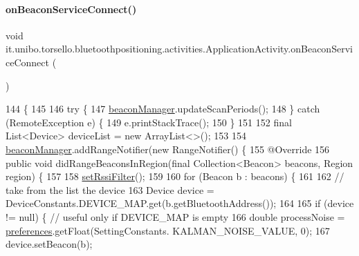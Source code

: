 \paragraph{\texorpdfstring{on\+Beacon\+Service\+Connect()}{onBeaconServiceConnect()}}
{\footnotesize\ttfamily void it.\+unibo.\+torsello.\+bluetoothpositioning.\+activities.\+Application\+Activity.\+on\+Beacon\+Service\+Connect (\begin{DoxyParamCaption}{ }\end{DoxyParamCaption})}


\begin{DoxyCode}
144                                          \{
145 
146         \textcolor{keywordflow}{try} \{
147             \hyperlink{classit_1_1unibo_1_1torsello_1_1bluetoothpositioning_1_1activities_1_1ApplicationActivity_a973c37226a3dbba6016966c3555aff65_a973c37226a3dbba6016966c3555aff65}{beaconManager}.updateScanPeriods();
148         \} \textcolor{keywordflow}{catch} (RemoteException e) \{
149             e.printStackTrace();
150         \}
151 
152         \textcolor{keyword}{final} List<Device> deviceList = \textcolor{keyword}{new} ArrayList<>();
153 
154         \hyperlink{classit_1_1unibo_1_1torsello_1_1bluetoothpositioning_1_1activities_1_1ApplicationActivity_a973c37226a3dbba6016966c3555aff65_a973c37226a3dbba6016966c3555aff65}{beaconManager}.addRangeNotifier(\textcolor{keyword}{new} RangeNotifier() \{
155             @Override
156             \textcolor{keyword}{public} \textcolor{keywordtype}{void} didRangeBeaconsInRegion(\textcolor{keyword}{final} Collection<Beacon> beacons, Region region) \{
157 
158                 \hyperlink{classit_1_1unibo_1_1torsello_1_1bluetoothpositioning_1_1activities_1_1ApplicationActivity_a8b2514096adfe574c15cc5317a45cd58_a8b2514096adfe574c15cc5317a45cd58}{setRssiFilter}();
159 
160                 \textcolor{keywordflow}{for} (Beacon b : beacons) \{
161 
162                     \textcolor{comment}{// take from the list the device}
163                     Device device = DeviceConstants.DEVICE\_MAP.get(b.getBluetoothAddress());
164 
165                     \textcolor{keywordflow}{if} (device != null) \{ \textcolor{comment}{// useful only if DEVICE\_MAP is empty}
166                         \textcolor{keywordtype}{double} processNoise = \hyperlink{classit_1_1unibo_1_1torsello_1_1bluetoothpositioning_1_1activities_1_1ApplicationActivity_a3ee672ef79c268d0618ff3276c2e85f0_a3ee672ef79c268d0618ff3276c2e85f0}{preferences}.getFloat(SettingConstants.
      KALMAN\_NOISE\_VALUE, 0);
167                         device.setBeacon(b);

\end{DoxyCode}
